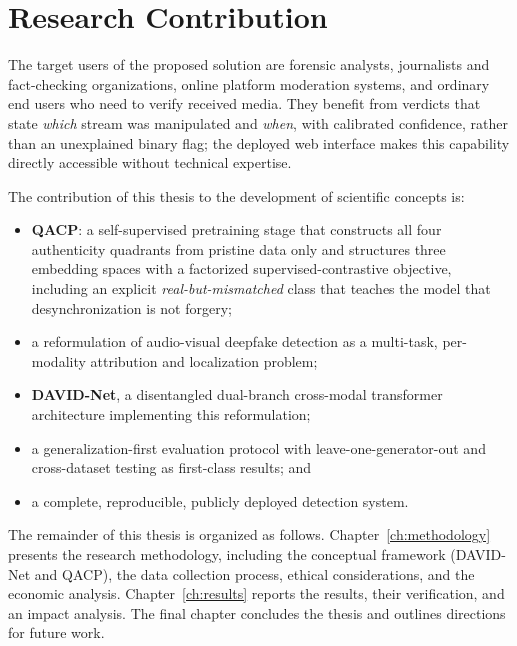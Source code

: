 \section{Research Contribution}
\label{sec:contribution}

The target users of the proposed solution are forensic analysts, journalists
and fact-checking organizations, online platform moderation systems, and
ordinary end users who need to verify received media. They benefit from
verdicts that state \emph{which} stream was manipulated and \emph{when}, with
calibrated confidence, rather than an unexplained binary flag; the deployed web
interface makes this capability directly accessible without technical
expertise.

The contribution of this thesis to the development of scientific concepts is:
\begin{itemize}
  \item \textbf{QACP}: a self-supervised pretraining stage that constructs all
        four authenticity quadrants from pristine data only and structures
        three embedding spaces with a factorized supervised-contrastive
        objective, including an explicit \emph{real-but-mismatched} class that
        teaches the model that desynchronization is not forgery;
  \item a reformulation of audio-visual deepfake detection as a multi-task,
        per-modality attribution and localization problem;
  \item \textbf{DAVID-Net}, a disentangled dual-branch cross-modal transformer
        architecture implementing this reformulation;
  \item a generalization-first evaluation protocol with leave-one-generator-out
        and cross-dataset testing as first-class results; and
  \item a complete, reproducible, publicly deployed detection system.
\end{itemize}

The remainder of this thesis is organized as follows.
Chapter~\ref{ch:methodology} presents the research methodology, including the
conceptual framework (DAVID-Net and QACP), the data collection process, ethical
considerations, and the economic analysis. Chapter~\ref{ch:results} reports the
results, their verification, and an impact analysis. The final chapter
concludes the thesis and outlines directions for future work.
